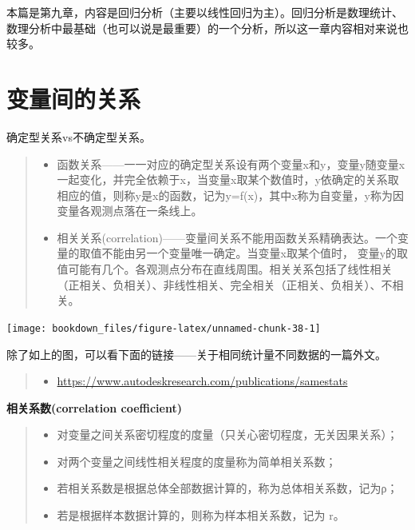 \documentclass[]{ctexbook}
\providecommand{\tightlist}{%
  \setlength{\itemsep}{0pt}\setlength{\parskip}{0pt}}
\begin{document}
本篇是第九章，内容是回归分析（主要以线性回归为主）。回归分析是数理统计、数理分析中最基础（也可以说是最重要）的一个分析，所以这一章内容相对来说也较多。

\hypertarget{ux53d8ux91cfux95f4ux7684ux5173ux7cfb}{%
\section{变量间的关系}\label{ux53d8ux91cfux95f4ux7684ux5173ux7cfb}}

确定型关系vs不确定型关系。

\begin{quote}
\begin{itemize}
\tightlist
\item
  函数关系------一一对应的确定型关系设有两个变量x和y，变量y随变量x一起变化，并完全依赖于x，当变量x取某个数值时，y依确定的关系取相应的值，则称y是x的函数，记为y=f(x)，其中x称为自变量，y称为因变量各观测点落在一条线上。
\item
  相关关系(correlation)------变量间关系不能用函数关系精确表达。一个变量的取值不能由另一个变量唯一确定。当变量x取某个值时， 变量y的取值可能有几个。各观测点分布在直线周围。相关关系包括了线性相关（正相关、负相关）、非线性相关、完全相关（正相关、负相关）、不相关。
\end{itemize}
\end{quote}

\texttt{[image: bookdown\_files/figure-latex/unnamed-chunk-38-1]}

除了如上的图，可以看下面的链接------关于相同统计量不同数据的一篇外文。

\begin{quote}
\begin{itemize}
\tightlist
\item
  \url{https://www.autodeskresearch.com/publications/samestats}
\end{itemize}
\end{quote}

\textbf{相关系数(correlation coefficient)}

\begin{quote}
\begin{itemize}
\tightlist
\item
  对变量之间关系密切程度的度量（只关心密切程度，无关因果关系）；
\item
  对两个变量之间线性相关程度的度量称为简单相关系数；
\item
  若相关系数是根据总体全部数据计算的，称为总体相关系数，记为ρ；
\item
  若是根据样本数据计算的，则称为样本相关系数，记为 r。
\end{itemize}
\end{quote}
\end{document}
